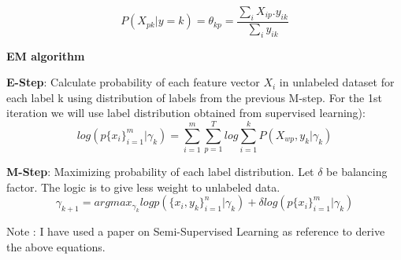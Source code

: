 \documentclass[letterpaper,11pt]{article}
\begin{document}
\[
P(X_{pk}|y = k) = \theta_{kp} = \frac{\sum_{i}{X_{ip}.y_{ik}}}{\sum_{i}y_{ik}}
\]

\textbf{EM algorithm}

\textbf{E-Step}: Calculate probability of each feature vector $X_{i}$ in unlabeled dataset for each label k using distribution of labels from the previous M-step. For the 1st iteration we will use label distribution obtained from supervised learning): 
\[
log (p\{x_i\}_{i = 1}^{m}| \gamma_k) = \sum_{i=1}^{m}\sum_{p=1}^{T} log\sum_{i=1}^{k}P(X_{wp},y_k|\gamma_{k})
\]	 

\textbf{M-Step}: Maximizing probability of each label distribution. Let $\delta$ be balancing factor. The logic is to give less weight to unlabeled data.
\[
\gamma_{k+1} = argmax_{\gamma_{k}} log p(\{x_i,y_k\}_{i=1}^{n}|\gamma_{k}) + \delta log (p\{x_i\}_{i = 1}^{m}| \gamma_{k})
\]

Note : I have used a paper on Semi-Supervised Learning as reference to derive the above equations.
\end{document}
